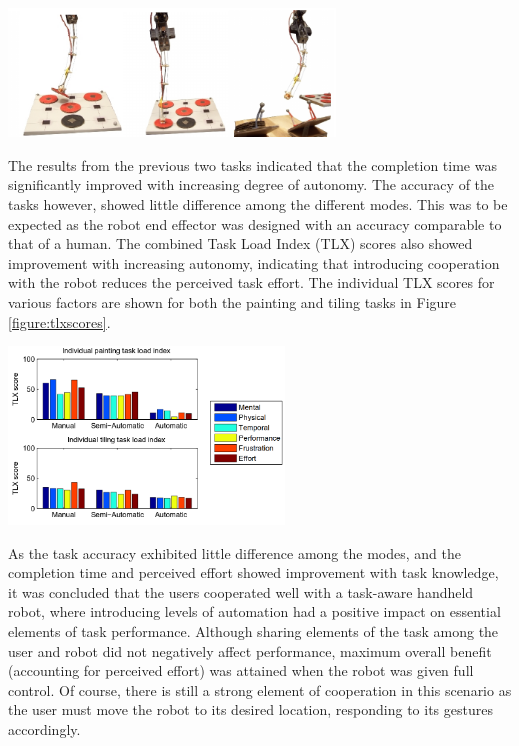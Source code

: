 \documentclass[11pt]{article}
\begin{document}
\begin{center}
\includegraphics[width=0.65\textwidth]{tilingtask.png}
\label{figure:tilingtask}
\end{center}

The results from the previous two tasks indicated that the completion time was significantly improved with increasing degree of autonomy. The accuracy of the tasks however, showed little difference among the different modes. This was to be expected as the robot end effector was designed with an accuracy comparable to that of a human. The combined Task Load Index (TLX) scores also showed improvement with increasing autonomy, indicating that introducing cooperation with the robot reduces the perceived task effort. The individual TLX scores for various factors are shown for both the painting and tiling tasks in Figure \ref{figure:tlxscores}.

\begin{center}
\includegraphics[width = 0.55\textwidth]{tlxscores.png}
\label{figure:tlxscores}
\end{center}

As the task accuracy exhibited little difference among the modes, and the completion time and perceived effort showed improvement with task knowledge, it was concluded that the users cooperated well with a task-aware handheld robot, where introducing levels of automation had a positive impact on essential elements of task performance. Although sharing elements of the task among the user and robot did not negatively affect performance, maximum overall benefit (accounting for perceived effort) was attained when the robot was given full control. Of course, there is still a strong element of cooperation in this scenario as the user must move the robot to its desired location, responding to its gestures accordingly.
	
\end{document}
